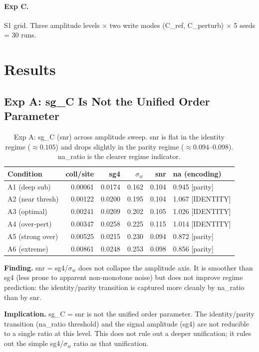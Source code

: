 \documentclass[11pt,a4paper]{article}
\begin{document}
\paragraph{Exp C.}
S1 grid. Three amplitude levels $\times$ two write modes (C\_ref, C\_perturb) $\times$ 5 seeds = 30 runs.

\section{Results}

\subsection{Exp A: sg\_C Is Not the Unified Order Parameter}

\begin{table}[h!]
\centering
\small
\begin{tabular}{lrrrrl}
\toprule
Condition & coll/site & sg4 & $\sigma_w$ & snr & na (encoding) \\
\midrule
A1 (deep sub) & 0.00061 & 0.0174 & 0.162 & 0.104 & 0.945 [parity] \\
A2 (near thresh) & 0.00122 & 0.0200 & 0.195 & 0.104 & 1.067 [IDENTITY] \\
A3 (optimal) & 0.00241 & 0.0209 & 0.202 & 0.105 & 1.026 [IDENTITY] \\
A4 (over-pert) & 0.00347 & 0.0258 & 0.225 & 0.115 & 1.014 [IDENTITY] \\
A5 (strong over) & 0.00525 & 0.0215 & 0.230 & 0.094 & 0.872 [parity] \\
A6 (extreme) & 0.00861 & 0.0248 & 0.253 & 0.098 & 0.856 [parity] \\
\bottomrule
\end{tabular}
\caption{Exp A: sg\_C (snr) across amplitude sweep. snr is flat in the
identity regime ($\approx 0.105$) and drops slightly in the parity regime
($\approx 0.094$--0.098). na\_ratio is the clearer regime indicator.}
\end{table}

\textbf{Finding.}
snr = sg4/$\sigma_w$ does not collapse the amplitude axis.
It is smoother than sg4 (less prone to apparent non-monotone noise) but
does not improve regime prediction: the identity/parity transition is captured
more cleanly by na\_ratio than by snr.

\textbf{Implication.}
sg\_C = snr is not the unified order parameter.
The identity/parity transition (na\_ratio threshold) and the signal amplitude
(sg4) are not reducible to a single ratio at this level.
This does not rule out a deeper unification; it rules out the simple
sg4/$\sigma_w$ ratio as that unification.
\end{document}
